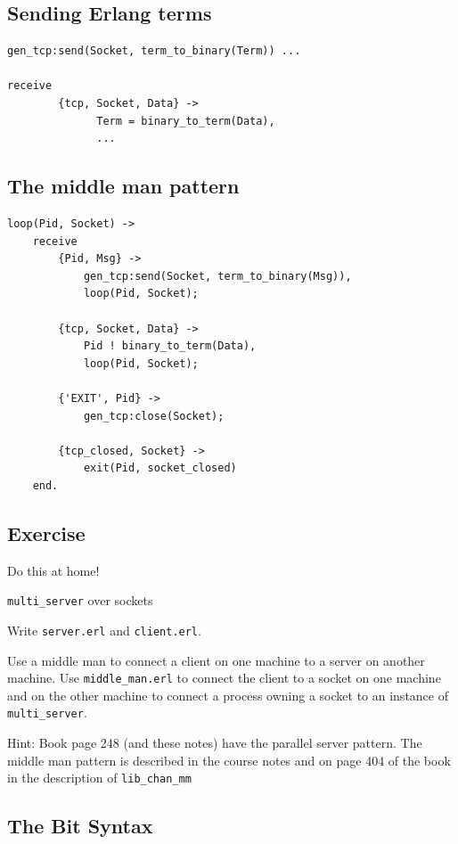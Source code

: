 \documentclass[12pt]{article}
\begin{document}
\subsection{Sending Erlang terms}

\begin{verbatim}
gen_tcp:send(Socket, term_to_binary(Term)) ...

receive
        {tcp, Socket, Data} ->
              Term = binary_to_term(Data),
              ...
\end{verbatim}

\subsection{The middle man pattern}

\begin{verbatim}
loop(Pid, Socket) ->
    receive
        {Pid, Msg} ->
            gen_tcp:send(Socket, term_to_binary(Msg)),
            loop(Pid, Socket);
            
        {tcp, Socket, Data} ->
            Pid ! binary_to_term(Data),
            loop(Pid, Socket);
            
        {'EXIT', Pid} ->
            gen_tcp:close(Socket);
            
        {tcp_closed, Socket} ->
            exit(Pid, socket_closed)
    end.
\end{verbatim}

\subsection{Exercise}

Do this at home!

\verb+multi_server+ over sockets

Write \verb+server.erl+ and \verb+client.erl+.

Use a middle man to connect a client on one machine to a server on
another machine. Use \verb+middle_man.erl+ to connect the client to a
socket on one machine and on the other machine to connect a process
owning a socket to an instance of \verb+multi_server+.

Hint: Book page 248 (and these notes) have the parallel server
pattern.  The middle man pattern is described in the course notes and
on page 404 of the book in the description of \verb+lib_chan_mm+

\subsection{The Bit Syntax}
\end{document}

